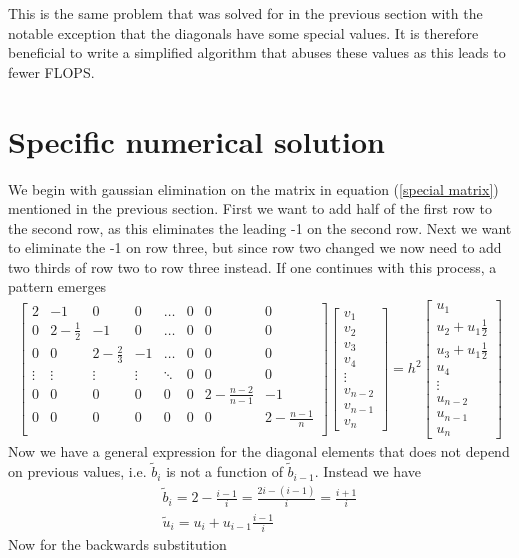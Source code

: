 \documentclass[10pt,a4paper]{article}
\begin{document}
    This is the same problem that was solved for in the previous section with the notable exception that the diagonals have some special values. It is therefore beneficial to write a simplified algorithm that abuses these values as this leads to fewer FLOPS.

	\newpage
    \section{Specific numerical solution}
    We begin with gaussian elimination on the matrix in equation (\ref{special matrix}) mentioned in the previous section. First we want to add half of the first row to the second row, as this eliminates the leading -1 on the second row. Next we want to eliminate the -1 on row three, but since row two changed we now need to add two thirds of row two to row three instead. If one continues with this process, a pattern emerges
    \begin{align*}
    \begin{bmatrix}
    2 & -1 & 0 & 0 & \dots & 0 & 0 & 0 \\
    0 & 2-\tfrac{1}{2} & -1 & 0 & \dots & 0 & 0 & 0 \\
    0 & 0 & 2-\tfrac{2}{3} & -1 & \dots & 0 & 0 & 0 \\
    \vdots & \vdots & \vdots & \vdots & \ddots & 0 & 0 & 0 \\
    0 & 0 & 0 & 0 & 0 & 0 & 2 - \tfrac{n-2}{n-1} & -1\\
    0 & 0 & 0 & 0 & 0 & 0 & 0 & 2 - \tfrac{n-1}{n} \\
    \end{bmatrix}
    \begin{bmatrix}
        v_1\\ v_2 \\ v_3 \\ v_4 \\ \vdots \\ v_{n-2} \\v_{n-1} \\ v_{n}
    \end{bmatrix}
    =h^2
    \begin{bmatrix}
        u_1 \\ u_2 + u_1\tfrac{1}{2} \\ u_3 + u_1\tfrac{1}{2} \\ u_4 \\ \vdots \\ u_{n-2} \\ u_{n-1} \\ u_{n}
    \end{bmatrix}   
    \end{align*}
    Now we have a general expression for the diagonal elements that does not depend on previous values, i.e. $\tilde{b}_i$ is not a function of $\tilde{b}_{i-1}$. Instead we have
    \begin{align*}
        \tilde{b}_i = 2 - \frac{i-1}{i} = \frac{2i-(i-1)}{i} =\frac{i+1}{i}\\
        \tilde{u}_i = u_i + u_{i-1}\tfrac{i-1}{i}
    \end{align*}
    Now for the backwards substitution

    
\end{document}

